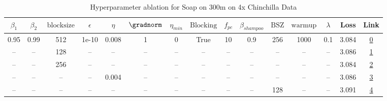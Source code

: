 \begin{table}[H]
\centering
\caption{Hyperparameter ablation for Soap on 300m on 4x Chinchilla Data}
\label{tab:ablation_soap_300m_on_4x_chinchilla_data}
\begin{tabular}{ccccccccccccccc}
\toprule
$\beta_1$ & $\beta_2$ & $\mathrm{block size}$ & $\epsilon$ & $\eta$ & $\gradnorm$ & $\eta_{min}$ & $\mathrm{Blocking}$ & $f_{pc}$ & $\beta_{shampoo}$ & $\mathrm{BSZ}$ & $\mathrm{warmup}$ & $\lambda$ & Loss & Link \\
\midrule
0.95 & 0.99 & 512 & 1e-10 & 0.008 & 1 & 0 & True & 10 & 0.9 & 256 & 1000 & 0.1 & 3.084 & \href{https://wandb.ai/stanford-mercury/optimizer-scaling/runs/sweep-300m-24B-soapeie4b166lr0.008-wd0.1-minlr0-warmup1000-b10.9-9894a6}{0} \\
\midrule
-- & -- & 128 & -- & -- & -- & -- & -- & -- & -- & -- & -- & -- & 3.086 & \href{https://wandb.ai/stanford-mercury/optimizer-scaling/runs/sweep-300m-24B-soapeib93333lr0.008-wd0.1-minlr0-warmup1000-b10.9-811046}{1} \\
-- & -- & 256 & -- & -- & -- & -- & -- & -- & -- & -- & -- & -- & 3.084 & \href{https://wandb.ai/stanford-mercury/optimizer-scaling/runs/sweep-300m-24B-soapei1f2d4flr0.008-wd0.1-minlr0-warmup1000-b10.9-63b43e}{2} \\
-- & -- & -- & -- & 0.004 & -- & -- & -- & -- & -- & -- & -- & -- & 3.086 & \href{https://wandb.ai/stanford-mercury/optimizer-scaling/runs/sweep-300m-24B-soapei97cdfclr0.004-wd0.1-minlr0-warmup1000-b10.9-97c1bf}{3} \\
-- & -- & -- & -- & -- & -- & -- & -- & -- & -- & 128 & -- & -- & 3.091 & \href{https://wandb.ai/stanford-mercury/optimizer-scaling/runs/sweep-300m-24B-soapeie57080lr0.008-wd0.1-minlr0-warmup1000-b10.9-7a725d}{4} \\
\bottomrule
\end{tabular}
\end{table}

